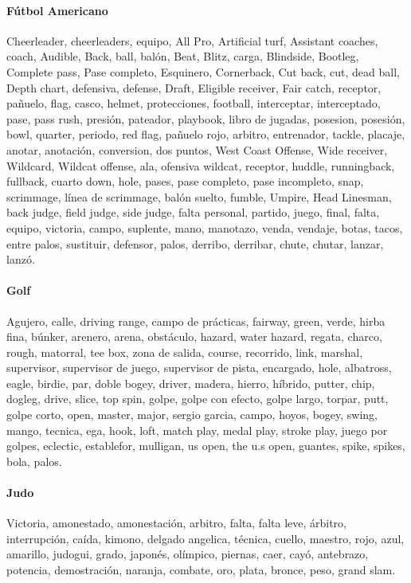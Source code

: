 \documentclass[../all.tex]{subfiles}
\begin{document}
    \paragraph{Fútbol Americano}
    Cheerleader, cheerleaders, equipo, All Pro, Artificial turf, Assistant coaches, coach, Audible, Back, ball, balón, Beat, Blitz, carga, Blindside, Bootleg, Complete pass, Pase completo, Esquinero, Cornerback, Cut back, cut, dead ball, Depth chart, defensiva, defense, Draft, Eligible receiver, Fair catch, receptor, pañuelo, flag, casco, helmet, protecciones, football, interceptar, interceptado, pase, pass rush, presión, pateador, playbook, libro de jugadas, posesion, posesión, bowl, quarter, periodo, red flag, pañuelo rojo, arbitro, entrenador, tackle, placaje, anotar, anotación, conversion, dos puntos, West Coast Offense, Wide receiver, Wildcard, Wildcat offense, ala, ofensiva wildcat, receptor, huddle, runningback, fullback, cuarto down, hole, pases, pase completo, pase incompleto, snap, scrimmage, línea de scrimmage, balón suelto, fumble, Umpire, Head Linesman, back judge, field judge, side judge, falta personal, partido, juego, final, falta, equipo, victoria, campo, suplente, mano, manotazo, venda, vendaje, botas, tacos, entre palos, sustituir, defensor, palos, derribo, derribar, chute, chutar, lanzar, lanzó.
    \paragraph{Golf}
    Agujero, calle, driving range, campo de prácticas, fairway, green, verde, hirba fina, búnker, arenero, arena, obstáculo, hazard, water hazard, regata, charco, rough, matorral, tee box, zona de salida, course, recorrido, link, marshal, supervisor, supervisor de juego, supervisor de pista, encargado, hole, albatross, eagle, birdie, par, doble bogey, driver, madera, hierro, híbrido, putter, chip, dogleg, drive, slice, top spin, golpe, golpe con efecto, golpe largo, torpar, putt, golpe corto, open, master, major, sergio garcia, campo, hoyos, bogey, swing, mango, tecnica, ega, hook, loft, match play, medal play, stroke play, juego por golpes, eclectic, establefor, mulligan, us open, the u.s open, guantes, spike, spikes, bola, palos.
    \paragraph{Judo}
    Victoria, amonestado, amonestación, arbitro, falta, falta leve, árbitro, interrupción, caída, kimono, delgado angelica, técnica, cuello, maestro, rojo, azul, amarillo, judogui, grado, japonés, olímpico, piernas, caer, cayó, antebrazo, potencia, demostración, naranja, combate, oro, plata, bronce, peso, grand slam.
\end{document}
